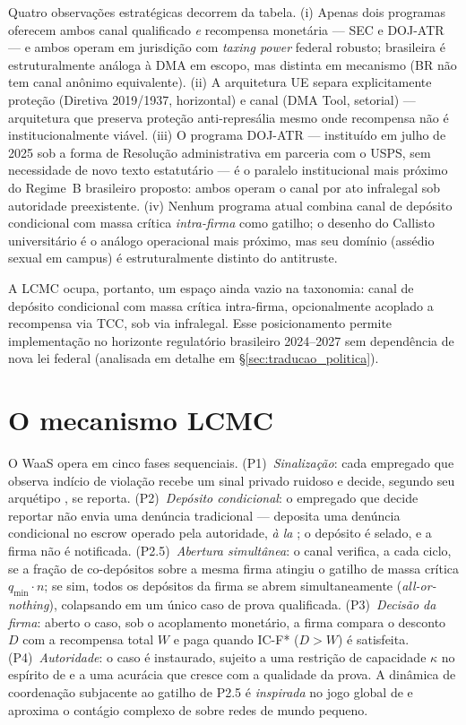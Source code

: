 \documentclass[12pt,a4paper]{article}
\begin{document}
Quatro observações estratégicas decorrem da tabela. (i) Apenas dois programas
oferecem ambos canal qualificado \emph{e} recompensa monetária --- SEC e DOJ-ATR ---
e ambos operam em jurisdição com \emph{taxing power} federal robusto;
\citet{lei12529} brasileira é estruturalmente análoga à DMA em escopo, mas
distinta em mecanismo (BR não tem canal anônimo equivalente). (ii) A
arquitetura UE separa explicitamente proteção (Diretiva 2019/1937, horizontal) e
canal (DMA Tool, setorial) --- arquitetura que preserva proteção anti-represália
mesmo onde recompensa não é institucionalmente viável.
(iii) O programa DOJ-ATR --- instituído em julho de 2025 sob a forma de
Resolução administrativa em parceria com o USPS, sem necessidade de novo
texto estatutário --- é o paralelo institucional mais próximo do Regime~B
brasileiro proposto: ambos operam o canal por ato infralegal sob autoridade
preexistente. (iv) Nenhum programa atual combina canal de depósito condicional
com massa crítica \emph{intra-firma} como gatilho; o desenho do Callisto
universitário \citep{callisto} é o análogo operacional mais próximo, mas seu
domínio (assédio sexual em campus) é estruturalmente distinto do antitruste.

A LCMC ocupa, portanto, um espaço ainda vazio na taxonomia: canal de depósito
condicional com massa crítica intra-firma, opcionalmente acoplado a recompensa
via TCC, sob via infralegal. Esse posicionamento permite implementação no
horizonte regulatório brasileiro 2024--2027 sem dependência de nova lei
federal (analisada em detalhe em \S\ref{sec:traducao_politica}).

\section{O mecanismo LCMC}
\label{sec:mecanismo}

O WaaS opera em cinco fases sequenciais. (P1)~\emph{Sinalização}: cada empregado que
observa indício de violação recebe um sinal privado ruidoso e decide, segundo seu
arquétipo \citep{hokamp2010income}, se reporta. (P2)~\emph{Depósito condicional}: o
empregado que decide reportar não envia uma denúncia tradicional --- deposita uma
denúncia condicional no escrow operado pela autoridade, \emph{à la}
\citet{ayres2012information}; o depósito é selado, e a firma não é notificada.
(P2.5)~\emph{Abertura simultânea}: o canal verifica, a cada ciclo, se a fração de
co-depósitos sobre a mesma firma atingiu o gatilho de massa crítica
$q_{\min}\cdot n$; se sim, todos os depósitos da firma se abrem simultaneamente
(\emph{all-or-nothing}), colapsando em um único caso de prova qualificada.
(P3)~\emph{Decisão da firma}: aberto o caso, sob o acoplamento monetário, a firma
compara o desconto $D$ com a recompensa total $W$ e paga quando IC-F* ($D > W$) é
satisfeita. (P4)~\emph{Autoridade}: o caso é instaurado, sujeito a uma restrição de
capacidade $\kappa$ no espírito de \citet{harrington2015when} e a uma acurácia que
cresce com a qualidade da prova. A dinâmica de coordenação subjacente ao gatilho de
P2.5 é \emph{inspirada} no jogo global de \citet{morris1998unique} e aproxima o
contágio complexo de \citet{centola2007complex} sobre redes de mundo pequeno.
\end{document}
